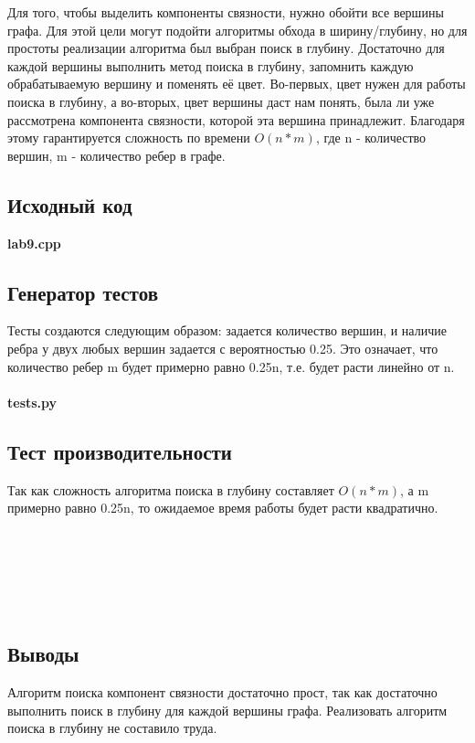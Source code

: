 \documentclass[12pt]{article}
\newcommand{\print}[1]{{\large  \bf  #1} 
{\scriptsize }}
\begin{document}
Для того, чтобы выделить компоненты связности, нужно обойти все вершины графа. Для этой цели могут подойти алгоритмы обхода в ширину/глубину, но для простоты реализации алгоритма был выбран поиск в глубину. Достаточно для каждой вершины выполнить метод поиска в глубину, запомнить каждую обрабатываемую вершину и поменять её цвет. Во-первых, цвет нужен для работы поиска в глубину, а во-вторых, цвет вершины даст нам понять, была ли уже рассмотрена компонента связности, которой эта вершина принадлежит. Благодаря этому гарантируется сложность по времени $O(n*m)$, где n - количество вершин, m - количество ребер в графе.
\subsection*{Исходный код}

\print{lab9.cpp}

\subsection*{Генератор тестов}
Тесты создаются следующим образом: задается количество вершин, и наличие ребра у двух любых вершин задается с вероятностью 0.25. Это означает, что количество ребер m будет примерно равно 0.25n, т.е. будет расти линейно от n. \\ \\
\print{tests.py}

\subsection*{Тест производительности}
Так как сложность алгоритма поиска в глубину составляет $O(n*m)$, а m примерно равно 0.25n, то ожидаемое время работы будет расти квадратично. \\ \\

\\ \\
\\
\subsection*{Выводы}

Алгоритм поиска компонент связности достаточно прост, так как достаточно выполнить поиск в глубину для каждой вершины графа. Реализовать алгоритм поиска в глубину не составило труда.
\end{document}
